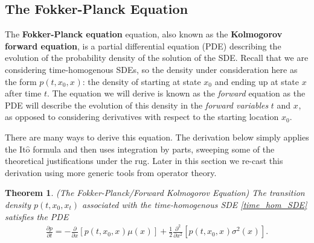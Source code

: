 \documentclass[12pt]{article}
\newcommand{\stateValue}[1][t]{x_{#1}}
\newcommand{\ito}{\text{It}\hat{\text{o}}}
\newtheorem{thm}{Theorem}
\begin{document}
\subsection{The Fokker-Planck Equation}
The \textbf{Fokker-Planck equation} equation, also known as the \textbf{Kolmogorov forward equation}, is a partial differential equation (PDE) describing the evolution of the 
probability density of the solution of the SDE. Recall that we are considering time-homogenous SDEs, so the density under consideration here as the form 
$p(t, \stateValue[0], \stateValue[])$: the density of starting at state $\stateValue[0]$ and ending up at state $\stateValue[]$ after time $t$. The equation we will derive is known 
as the \textit{forward} equation as the PDE will describe the evolution of this density in the \textit{forward variables} $t$ and $\stateValue[]$, as opposed to considering derivatives
with respect to the starting location $\stateValue[0]$. 

There are many ways to derive this equation. The derivation below simply applies the $\ito$ formula and then uses integration by parts, sweeping some of the theoretical 
justifications under the rug. Later in this section we re-cast this derivation using more generic tools from operator theory. 

\begin{thm}
(The Fokker-Planck/Forward Kolmogorov Equation) The transition density $p(t, \stateValue[0], \stateValue)$ associated with the time-homogenous SDE
\ref{time_hom_SDE} satisfies the PDE
\begin{align}
\frac{\partial p}{\partial t} = -\frac{\partial}{\partial x} [p(t, \stateValue[0], \stateValue[])\mu(\stateValue[])] + \frac{1}{2} \frac{\partial^2}{\partial x^2} [p(t, \stateValue[0], \stateValue[]) \sigma^2(\stateValue[])].
\end{align}
\end{thm}
\end{document}
